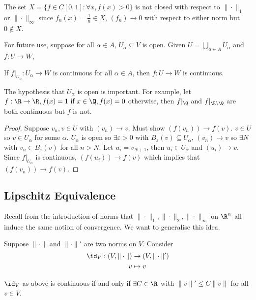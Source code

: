 \documentclass[a4paper]{article}
\theoremstyle{definition}
\begin{document}
\begin{eg}
  The set \(X=\{f\in C[0,1]: \forall x, f(x)>0\}\) is not closed with respect to \(\|\cdot\|_1\) or \(\|\cdot\|_\infty\) since \(f_n(x) = \frac{1}{n} \in X\), \((f_n) \to 0\) with respect to either norm but \(0 \notin X\).
\end{eg}

For future use, suppose for all \(\alpha \in A\), \(U_\alpha \subseteq V\) is open. Given \(U = \bigcup_{\alpha\in A}U_\alpha\) and \(f: U \to W\),

\begin{proposition}
  If \(f|_{U_\alpha}:U_\alpha \to W\) is continuous for all \(\alpha \in A\), then \(f: U \to W\) is continuous.
\end{proposition}

\begin{note}
  The hypothesis that \(U_\alpha\) is open is important. For example, let \(f:\R\to\R, f(x) = 1 \text{ if } x\in\Q, f(x)=0\) otherwise, then \(f|_\Q\) and \(f|_{\R\setminus\Q}\) are both continuous but \(f\) is not.
\end{note}

\begin{proof}
  Suppose \(v_n, v\in U\) with \((v_n)\to v\). Must show \((f(v_n))\to f(v)\). \(v\in U\) so \(v\in U_\alpha\) for some \(\alpha\). \(U_\alpha\) is open so \(\exists \varepsilon >0\) with \(B_\varepsilon(v) \subseteq U_\alpha\), \((v_n)\to v\) so \(\exists N\) with \(v_n \in B_\varepsilon(v)\) for all \(n>N\). Let \(u_i=v_{N+1}\), then \(u_i\in U_\alpha\) and \((u_i)\to v\). Since \(f|_{U_\alpha}\) is continuous, \((f(u_i))\to f(v)\) which implies that \((f(v_n)) \to f(v)\).
\end{proof}

\subsection{Lipschitz Equivalence}

Recall from the introduction of norms that \(\|\cdot\|_1, \|\cdot\|_2, \|\cdot\|_\infty\) on \(\R^n\) all induce the same notion of convergence. We want to generalise this idea.

Suppose \(\|\cdot\|\) and \(\|\cdot\|'\) are two norms on \(V\). Consider
\begin{align*}
  \id_V:(V,\|\cdot\|) &\to (V,\|\cdot\|') \\
  v &\mapsto v
\end{align*}

\begin{proposition}
  \label{prop:continuity of id}
  \(\id_V\) as above is continuous if and only if \(\exists C \in \R\) with \(\|v\|' \leq C \|v\|\) for all \(v \in V\).
\end{proposition}
\end{document}
